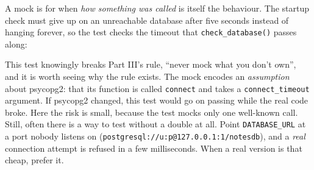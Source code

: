 \noindent{}A mock is for when \emph{how something was called} is itself the behaviour. The startup check must give up on an unreachable database after five seconds instead of hanging forever, so the test checks the timeout that \texttt{check\_database()} passes along:

\begin{codebox}

\begin{Shaded}
\begin{Highlighting}[]




\OperatorTok{=}
\OperatorTok{=} \NormalTok{(}\NormalTok{)}
\NormalTok{, }\NormalTok{)}

    \NormalTok{):}

    \NormalTok{.call\_args.kwargs[}\NormalTok{] }\OperatorTok{==} 
\end{Highlighting}
\end{Shaded}

\end{codebox}

\noindent{}This test knowingly breaks Part III's rule, ``never mock what you don't own'', and it is worth seeing why the rule exists. The mock encodes an \emph{assumption} about psycopg2: that its function is called \texttt{connect} and takes a \texttt{connect\_timeout} argument. If psycopg2 changed, this test would go on passing while the real code broke. Here the risk is small, because the test mocks only one well-known call. Still, often there is a way to test without a double at all. Point \texttt{DATABASE\_URL} at a port nobody listens on (\texttt{postgresql:}\allowbreak{}\texttt{/}\allowbreak{}\texttt{/}\allowbreak{}\texttt{u:}\allowbreak{}\texttt{p@127.}\allowbreak{}\texttt{0.}\allowbreak{}\texttt{0.}\allowbreak{}\texttt{1:}\allowbreak{}\texttt{1/}\allowbreak{}\texttt{notesdb}), and a \emph{real} connection attempt is refused in a few milliseconds. When a real version is that cheap, prefer it.


